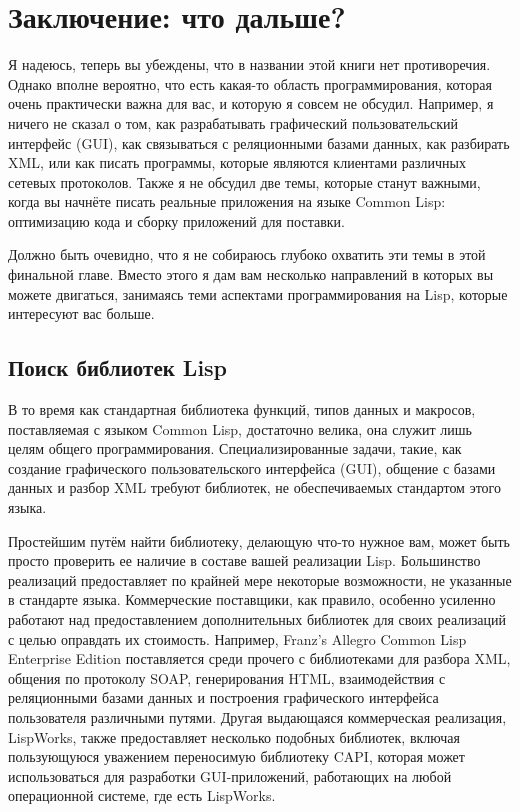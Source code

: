 \chapter{Заключение: что дальше?}
\label{ch:32}

Я надеюсь, теперь вы убеждены, что в названии этой книги нет противоречия.  Однако вполне
вероятно, что есть какая-то область программирования, которая очень практически важна для
вас, и которую я совсем не обсудил. Например, я ничего не сказал о том, как разрабатывать
графический пользовательский интерфейс (GUI), как связываться с реляционными базами
данных, как разбирать XML, или как писать программы, которые являются клиентами различных
сетевых протоколов. Также я не обсудил две темы, которые станут важными, когда вы начнёте
писать реальные приложения на языке Common Lisp: оптимизацию кода и сборку приложений для
поставки.

Должно быть очевидно, что я не собираюсь глубоко охватить эти темы в этой финальной
главе. Вместо этого я дам вам несколько направлений в которых вы можете двигаться,
занимаясь теми аспектами программирования на Lisp, которые интересуют вас больше.

\section{Поиск библиотек Lisp}

В то время как стандартная библиотека функций, типов данных и макросов, поставляемая с
языком Common Lisp, достаточно велика, она служит лишь целям общего
программирования. Специализированные задачи, такие, как создание графического
пользовательского интерфейса (GUI), общение с базами данных и разбор XML требуют
библиотек, не обеспечиваемых стандартом этого языка.

Простейшим путём найти библиотеку, делающую что-то нужное вам, может быть просто проверить
ее наличие в составе вашей реализации Lisp. Большинство реализаций предоставляет по
крайней мере некоторые возможности, не указанные в стандарте языка. Коммерческие
поставщики, как правило, особенно усиленно работают над предоставлением дополнительных
библиотек для своих реализаций с целью оправдать их стоимость. Например, Franz's Allegro
Common Lisp Enterprise Edition поставляется среди прочего с библиотеками для разбора XML,
общения по протоколу SOAP, генерирования HTML, взаимодействия с реляционными базами данных
и построения графического интерфейса пользователя различными путями.  Другая выдающаяся
коммерческая реализация, LispWorks, также предоставляет несколько подобных библиотек,
включая пользующуюся уважением переносимую библиотеку CAPI, которая может использоваться
для разработки GUI-приложений, работающих на любой операционной системе, где есть
LispWorks.

